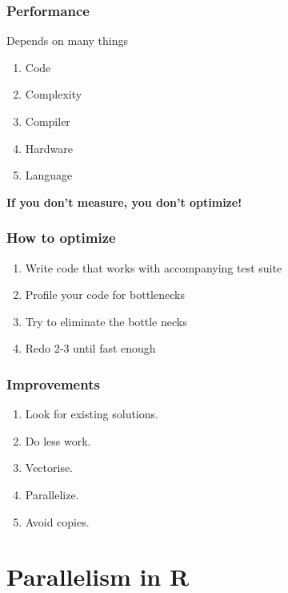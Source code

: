\documentclass{beamer}
\begin{document}
\begin{frame}
	\frametitle{Performance}
	\begin{center}
		Depends on many things
		\begin{enumerate}
			\item Code
			\item Complexity
			\item Compiler
			\item Hardware
			\item Language
		\end{enumerate}
		\bigskip
		\textbf{If you don't measure, you don't optimize!}
	\end{center}
\end{frame}

\begin{frame}
	\frametitle{How to optimize}
	\begin{center}
		\begin{enumerate}
			\item Write code that works with accompanying test suite
			\item Profile your code for bottlenecks
			\item Try to eliminate the bottle necks
			\item Redo 2-3 until fast enough
		\end{enumerate}
	\end{center}
\end{frame}

\begin{frame}
	\frametitle{Improvements}
	\begin{center}
		\begin{enumerate}
			\item Look for existing solutions.
			\item Do less work.
			\item Vectorise.
			\item Parallelize.
			\item Avoid copies.
		\end{enumerate}
	\end{center}
\end{frame}

\section{Parallelism in R}
\end{document}

